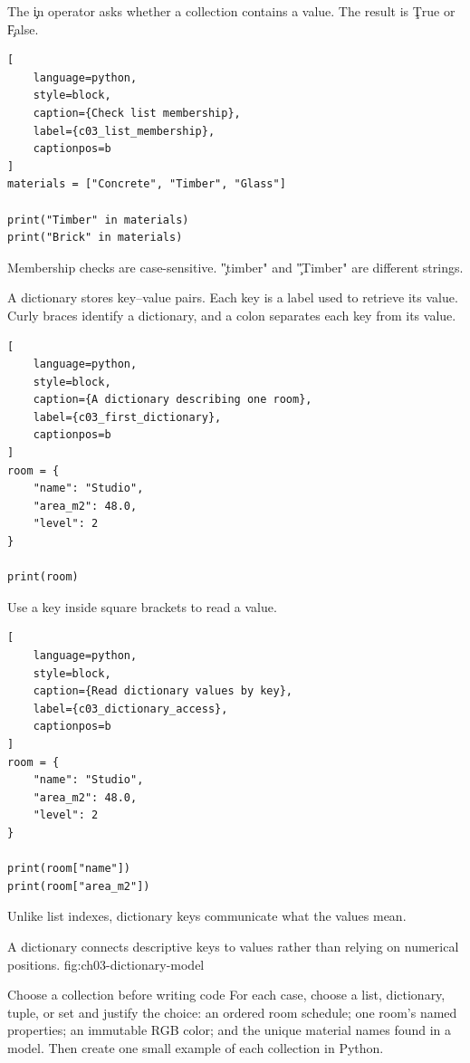 
The \c{in} operator asks whether a collection contains a value. The result is
\c{True} or \c{False}.

\begin{lstlisting}[
    language=python,
    style=block,
    caption={Check list membership},
    label={c03_list_membership},
    captionpos=b
]
materials = ["Concrete", "Timber", "Glass"]

print("Timber" in materials)
print("Brick" in materials)
\end{lstlisting}

Membership checks are case-sensitive. \c{"timber"} and \c{"Timber"} are
different strings.


A dictionary stores key--value pairs. Each key is a label used to retrieve its
value. Curly braces identify a dictionary, and a colon separates each key from
its value.

\begin{lstlisting}[
    language=python,
    style=block,
    caption={A dictionary describing one room},
    label={c03_first_dictionary},
    captionpos=b
]
room = {
    "name": "Studio",
    "area_m2": 48.0,
    "level": 2
}

print(room)
\end{lstlisting}

Use a key inside square brackets to read a value.

\begin{lstlisting}[
    language=python,
    style=block,
    caption={Read dictionary values by key},
    label={c03_dictionary_access},
    captionpos=b
]
room = {
    "name": "Studio",
    "area_m2": 48.0,
    "level": 2
}

print(room["name"])
print(room["area_m2"])
\end{lstlisting}

Unlike list indexes, dictionary keys communicate what the values mean.

{A dictionary connects descriptive keys to values rather than relying on numerical positions.}
{fig:ch03-dictionary-model}

\begin{TryBox}{Choose a collection before writing code}
For each case, choose a list, dictionary, tuple, or set and justify the choice:
an ordered room schedule; one room's named properties; an immutable RGB color;
and the unique material names found in a model. Then create one small example
of each collection in Python.
\end{TryBox}

